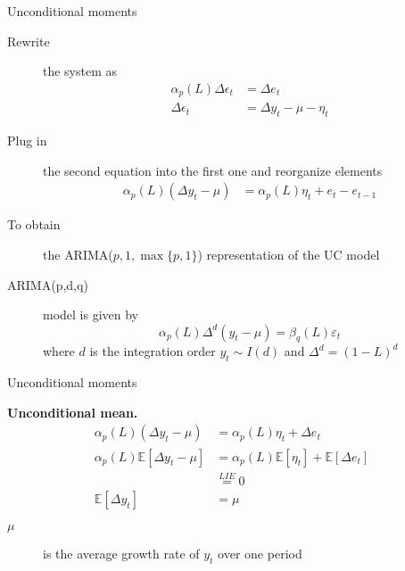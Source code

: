 \documentclass[notes,blackandwhite,mathsans,usenames,dvipsnames]{beamer}
\begin{document}
\begin{frame}{Unconditional moments}

\begin{description}
\item[Rewrite] {\color{mcxs2}the system as}
\begin{align*}
\alpha_p(L)\Delta \epsilon_t &=  \Delta e_t\\[1ex]
\Delta \epsilon_t &= \Delta y_t - \mu - \eta_t 
\end{align*}
\item[Plug in] {\color{mcxs2}the second equation into the first one and reorganize elements}
\begin{align*}
\alpha_p(L)(\Delta y_t - \mu) &= \alpha_p(L)\eta_t + e_t - e_{t-1}
\end{align*}
\item[To obtain] {\color{mcxs2}the} {\color{purple}ARIMA($p,1,\max\{p,1\}$) representation of the UC model}

\bigskip\item[ARIMA(p,d,q)] {\color{mcxs2}model is given by}
$$ \alpha_p(L)\Delta^d (y_t-\mu) = \beta_q(L)\varepsilon_t $$
{\color{mcxs2}where} $d$ {\color{mcxs2}is the integration order} $y_t\sim I(d)$ {\color{mcxs2}and} $\Delta^d = (1-L)^d$
\end{description}

\end{frame}




\begin{frame}{Unconditional moments}

\textbf{Unconditional mean.}
\begin{align*}
\alpha_p(L)(\Delta y_t-\mu) &= \alpha_p(L)\eta_t + \Delta e_t\\[2ex]
\alpha_p(L)\mathbb{E}[\Delta y_t-\mu] &= \alpha_p(L)\mathbb{E}[\eta_t] + \mathbb{E}[\Delta e_t]\\
&\overset{LIE}{=} 0\\[2ex]
\mathbb{E}[\Delta y_t] &=\mu
\end{align*}

\bigskip\begin{description}
\item[$\mu$] {\color{mcxs2}is the average growth rate of} $y_t$ {\color{mcxs2}over one period}
\end{description}

\end{frame}
\end{document}
